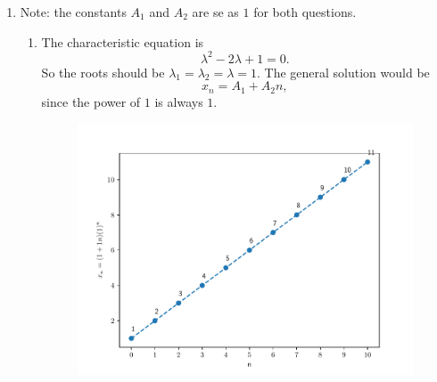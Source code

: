 \begin{homeworkProblem}
\begin{enumerate}
        \pagebreak
        \item Note: the constants $A_1$ and $A_2$ are se as $1$ for both questions.
        \begin{enumerate}[label=(\roman*)]
        \addtocounter{enumii}{1}
            \item The characteristic equation is \[
                \lambda^2 - 2\lambda + 1 = 0.
            \]
            So the roots should be $\lambda_1 = \lambda_2 = \lambda = 1$.
            The general solution would be \[
                x_n = A_1 + A_2 n,
            \] since the power of $1$ is always $1$.
            \begin{figure}[H]
                \centering
                \includegraphics[scale=0.5]{fig/fig3(b)(ii).pdf}
            \end{figure}
    

\end{enumerate}
\end{enumerate}
\end{homeworkProblem}
